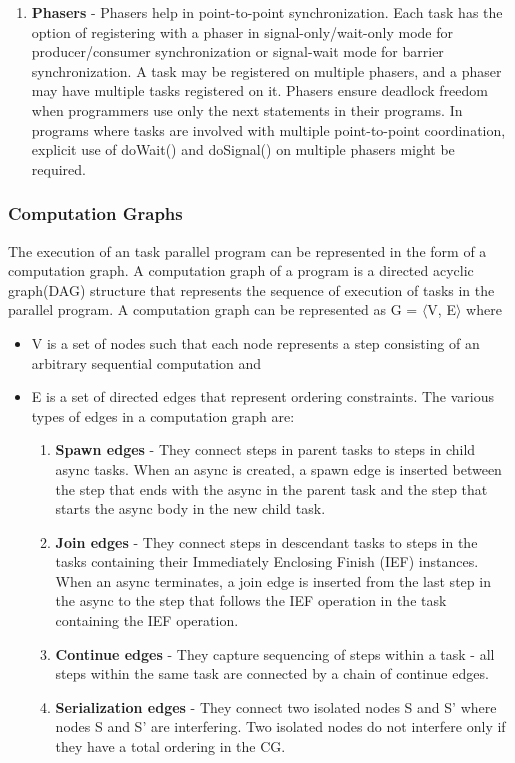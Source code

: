 \begin{enumerate}
\begin{enumerate}
\item \textbf{Phasers} - Phasers help in point-to-point synchronization. Each task has the option of registering with a phaser in signal-only/wait-only mode for producer/consumer synchronization or signal-wait mode for barrier synchronization. A task may be registered on multiple phasers, and a phaser may have multiple tasks registered on it. Phasers ensure deadlock freedom when programmers use only the next statements in their programs. In programs where tasks are involved with multiple point-to-point coordination, explicit use of doWait() and doSignal() on multiple phasers might be required.  
\end{enumerate}
\end{enumerate}

\subsubsection{Computation Graphs}
The execution of an task parallel program can be represented in the form of a computation graph. A computation graph of a program is a directed acyclic graph(DAG) structure that represents the sequence of execution of tasks in the parallel program. A computation graph can be represented as G = $\langle$V, E$\rangle$ where
\begin{itemize}
\item V is a set of nodes such that  each node represents a step consisting of an arbitrary sequential computation and
\item E is a set of directed edges that represent ordering constraints. The various types of edges in a computation graph are:
\begin{enumerate}
 \item \textbf{Spawn edges} - They connect steps in parent tasks to steps in child async tasks. When an async is created, a spawn edge is inserted between the step that ends with the async in the parent task and the step that starts the async body in the new child task.
\item \textbf{Join edges} - They connect steps in descendant tasks to steps in the tasks containing their Immediately Enclosing Finish (IEF) instances. When an async terminates, a join edge is inserted from the last step in the async to the step that follows the IEF operation in the task containing the IEF operation.
\item \textbf{Continue edges} - They capture sequencing of steps within a task - all steps within the same task are connected by a chain of continue edges.
\item \textbf{Serialization edges} - They connect two isolated nodes S and S' where nodes S and S' are interfering. Two isolated nodes do not interfere only if they have a total ordering in the CG.
 \end{enumerate} 
\end{itemize}

